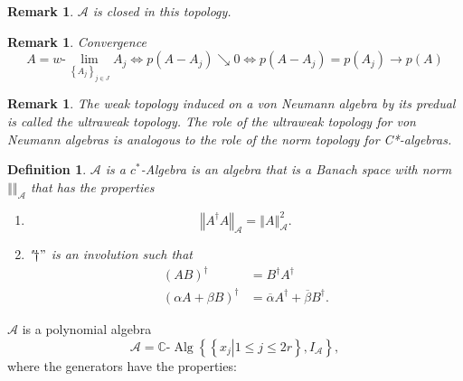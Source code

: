 \documentclass[aps,preprint]{revtex4}%
\newtheorem{definition}[theorem]{Definition}
\newtheorem{remark}[theorem]{Remark}
\begin{document}
\begin{remark}
$\mathcal{A}$ is closed in this topology.
\end{remark}

\begin{remark}
Convergence
\begin{equation}
A=w\text{-}\lim\limits_{\left\{  A_{j}\right\}  _{j\in J}}A_{j}\Leftrightarrow
p\left(  A-A_{j}\right)  \searrow0\Leftrightarrow p\left(  A-A_{j}\right)
=p\left(  A_{j}\right)  \longrightarrow p\left(  A\right)
\end{equation}

\end{remark}

\begin{remark}
The \emph{weak topology} induced on a von Neumann algebra by its predual is
called the \emph{ultraweak topology}. The role of the \emph{ultraweak
topology} for von Neumann algebras is analogous to the role of the \emph{norm
topology for C*-algebras}.
\end{remark}

\begin{definition}
$\mathcal{A}$ is a $c^{\ast}$-Algebra is an algebra that is a Banach space
with norm $\left\Vert {}\right\Vert _{\mathcal{A}}$ that has the properties

\begin{enumerate}
\item
\begin{equation}
\left\Vert A^{\dagger}A\right\Vert _{\mathcal{A}}=\left\Vert A\right\Vert
_{\mathcal{A}}^{2}.
\end{equation}


\item "$\dagger"$ is an involution such that
\begin{align}
\left(  AB\right)  ^{\dagger}  &  =B^{\dagger}A^{\dagger}\\
\left(  \alpha A+\beta B\right)  ^{\dagger}  &  =\overline{\alpha}A^{\dagger
}+\overline{\beta}B^{\dagger}.
\end{align}

\end{enumerate}
\end{definition}

$\mathcal{A}$ is a polynomial algebra
\begin{equation}
\mathcal{A}=\mathbb{C}\text{-}\operatorname*{Alg}\left\{  \left\{  \left.
x_{j}\right\vert 1\leq j\leq2r\right\}  ,I_{\mathcal{A}}\right\}  ,
\end{equation}
where the generators have the properties:
\end{document}
